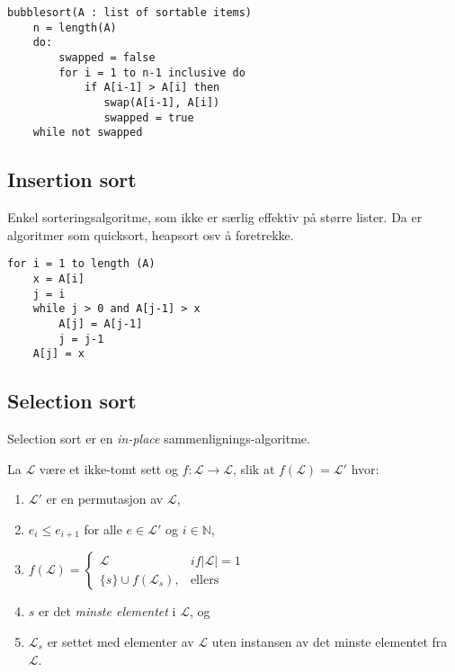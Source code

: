 \documentclass[11pt,a4paper]{article}
\theoremstyle{def}
\begin{document}
\begin{Verbatim}[frame=single]
bubblesort(A : list of sortable items)
    n = length(A)
    do:
        swapped = false
        for i = 1 to n-1 inclusive do
            if A[i-1] > A[i] then
               swap(A[i-1], A[i])
               swapped = true
    while not swapped
\end{Verbatim}

\subsection{Insertion sort}
Enkel sorteringsalgoritme, som ikke er særlig effektiv på større lister. Da er algoritmer som quicksort, heapsort osv å foretrekke.

\begin{Verbatim}[frame=single]
for i = 1 to length (A)
    x = A[i]
    j = i
    while j > 0 and A[j-1] > x
        A[j] = A[j-1]
        j = j-1
    A[j] = x
\end{Verbatim}

\subsection{Selection sort}
Selection sort er en \textit{in-place} sammenlignings-algoritme.

\noindent La $\mathcal{L}$ være et ikke-tomt sett og $f : \mathcal{L} \rightarrow \mathcal{L}$, slik at $f(\mathcal{L}) = \mathcal{L}'$ hvor:
\begin{enumerate}
\item
$\mathcal{L}'$ er en permutasjon av $\mathcal{L}$,

\item
$e_i \leq e_{i+1}$ for alle $e \in \mathcal{L}'$ og $i \in \mathbb{N}$,

\item
$f(\mathcal{L}) = \left\{\begin{array}{ll}
   \mathcal{L} & if |\mathcal{L}|=1\\
    \{s\} \cup f(\mathcal{L}_s),&\mathrm{ellers}
  \end{array}\right.$

\item
$s$ er det \textit{minste elementet} i $\mathcal{L}$, og

\item
$\mathcal{L}_s$ er settet med elementer av $\mathcal{L}$ uten instansen av det minste elementet fra $\mathcal{L}$.
\end{enumerate}
\end{document}
